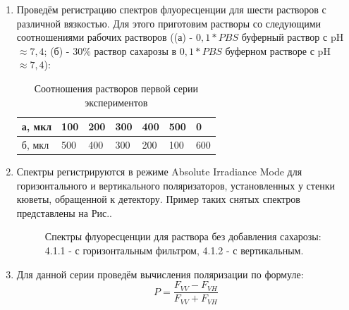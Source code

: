\documentclass{article}
\begin{document}
\begin{enumerate}
    \item Проведём регистрацию спектров флуоресценции для шести растворов с различной вязкостью. Для этого приготовим растворы со следующими соотношениями рабочих растворов ((а) - $0,1 * PBS$ буферный раствор с pH $\approx 7,4$; (б) - $30 \%$ раствор сахарозы в $0,1 * PBS$ буферном растворе с pH $\approx 7,4$):

    \begin{table}[h!]
    \centering
    \caption{Соотношения растворов первой серии экспериментов}
    \begin{tabular}{|l|l|l|l|l|l|l|}
    \hline
    а, мкл & 100 & 200 & 300 & 400 & 500 & 0 \\ \hline
    б, мкл & 500 & 400 & 300 & 200 & 100 & 600 \\ \hline
    \end{tabular}
    \end{table}

    \item Спектры регистрируются в режиме Absolute Irradiance Mode для горизонтального и вертикального поляризаторов, установленных у стенки кюветы, обращенной к детектору. Пример таких снятых спектров представлены на Рис.. 
    \begin{figure}[h!]
        \caption{Спектры флуоресценции для раствора без добавления сахарозы: 4.1.1 - с горизонтальным фильтром, 4.1.2 - с вертикальным.}
    \end{figure}

    \item Для данной серии проведём вычисления поляризации по формуле:
    \begin{equation}
        P = \frac{F_{VV} - F_{VH}}{F_{VV} + F_{VH}}
    \end{equation}


\end{enumerate}
\end{document}
